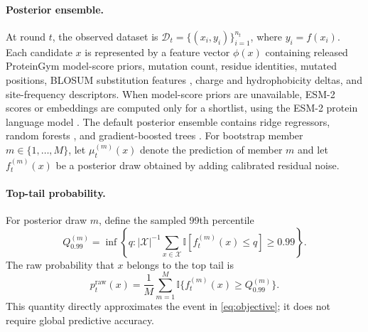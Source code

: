 \documentclass{article}
\newcommand{\xset}{\mathcal X}
\newcommand{\dset}{\mathcal D}
\newcommand{\I}{\mathbb I}
\begin{document}
\paragraph{Posterior ensemble.} At round $t$, the observed dataset is $\dset_t=\{(x_i,y_i)\}_{i=1}^{n_t}$, where $y_i=f(x_i)$. Each candidate $x$ is represented by a feature vector $\phi(x)$ containing released ProteinGym model-score priors, mutation count, residue identities, mutated positions, BLOSUM substitution features \citep{henikoff1992blosum}, charge and hydrophobicity deltas, and site-frequency descriptors. When model-score priors are unavailable, ESM-2 scores or embeddings are computed only for a shortlist, using the ESM-2 protein language model \citep{lin2023esm}. The default posterior ensemble contains ridge regressors, random forests \citep{breiman2001rf}, and gradient-boosted trees \citep{friedman2001gbm}. For bootstrap member $m\in\{1,\ldots,M\}$, let $\mu_t^{(m)}(x)$ denote the prediction of member $m$ and let $f_t^{(m)}(x)$ be a posterior draw obtained by adding calibrated residual noise.

\paragraph{Top-tail probability.} For posterior draw $m$, define the sampled 99th percentile
\begin{equation}
Q_{0.99}^{(m)}=\inf\left\{q: |\xset|^{-1}\sum_{x\in\xset}\I[f_t^{(m)}(x)\le q]\ge 0.99\right\}.
\end{equation}
The raw probability that $x$ belongs to the top tail is
\begin{equation}
\label{eq:praw}
p_t^{\mathrm{raw}}(x)=\frac{1}{M}\sum_{m=1}^{M}\I\{f_t^{(m)}(x)\ge Q_{0.99}^{(m)}\}.
\end{equation}
This quantity directly approximates the event in \cref{eq:objective}; it does not require global predictive accuracy.
\end{document}
